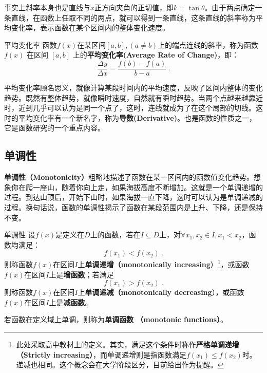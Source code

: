 事实上斜率本身也是直线与$x$正方向夹角的正切值，即$k=\tan\theta$。由于两点确定一条直线，在函数上任取不同的两点，就可以得到一条直线，这条直线的斜率称为平均变化率，表示函数在某个区间内的整体变化速度。

\begin{definition}{平均变化率}
函数$f(x)$在某区间$[a, b],(a\neq b)$上的端点连线的斜率，称为函数 $f(x)$ 在区间 $[a, b]$ 上的\textbf{平均变化率(Average Rate of Change)}，即：
\begin{equation}
\frac{\Delta y}{\Delta x}=\frac{f(b) - f(a)}{b - a}~.
\end{equation}
\end{definition}

平均变化率顾名思义，就像计算某段时间内的平均速度，反映了区间内整体的变化趋势。既然有整体趋势，就像瞬时速度，自然就有瞬时趋势。当两个点越来越靠近时，近到几乎可以认为是同一个点了，这时，连线就成为了在这个局部的切线。这时的平均变化率有一个新名字，称为\textbf{导数(Derivative)}。也是函数的性质之一，它是函数研究的一个重点内容。

\subsection{单调性}\label{sub_HsFunC_1}

\textbf{单调性（Monotonicity）}粗略地描述了函数在某一区间内的函数值变化趋势。想象你在爬一座山，随着你向上走，如果海拔高度不断增加。这就是一个单调递增的过程。到达山顶后，开始下山时，如果海拔一直下降，这时可以认为是单调递减的过程。换句话说，函数的单调性揭示了函数在某段范围内是上升、下降，还是保持不变。

\begin{definition}{单调性}
设$f(x)$是定义在$D$上的函数，若在$I\subseteq D$上，对$\forall x_1,x_2\in I,x_1< x_2$，函数均满足：
\begin{equation}
f(x_1)<f(x_2)~.
\end{equation}
则称函数$f(x)$在区间$I$上\textbf{单调递增（monotonically increasing}）\footnote{此处采取高中教材上的定义。其实，满足这个条件时称作\textbf{严格单调递增 （Strictly increasing）}，而单调递增则是指函数满足$f(x_1)\leq f(x_2)$时。递减也相同。这个概念会在大学阶段区分，目前给出作为提醒。}，或函数$f(x)$在区间$I$上是\textbf{增函数}；若满足
\begin{equation}
f(x_1)>f(x_2)~.
\end{equation}
则称函数$f(x)$在区间$I$上\textbf{单调递减（monotonically decreasing}），或函数$f(x)$在区间$I$上是\textbf{减函数}。

若函数在定义域上单调，则称为\textbf{单调函数 （monotonic functions）}。
\end{definition}

